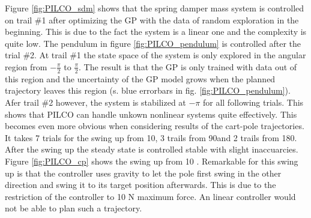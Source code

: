 \documentclass[letterpaper, 10 pt, conference]{ieeeconf}  %
\begin{document}
Figure \ref{fig:PILCO_sdm} shows that the spring damper mass system is controlled on trail \#1 after optimizing the GP with the data of random exploration in the beginning. This is due to the fact the system is a linear one and the complexity is quite low. 
The pendulum in figure \ref{fig:PILCO_pendulum} is controlled after the trial \#2. At trail \#1 the state space of the system is only explored in the angular region from $-\frac{\pi}{2}$ to $\frac{\pi}{2}$. The result is that the GP is only trained with data out of this region and the uncertainty of the GP model grows when the planned trajectory leaves this region (s. blue errorbars in fig. \ref{fig:PILCO_pendulum}). Afer trail \#2 however, the system is stabilized at $-\pi$ for all following trials.
This shows that PILCO can handle unkown nonlinear systems quite effectively. This becomes even more obvious when considering results of the cart-pole trajectories. It takes 7 trials for the swing up from 10\textdegree, 3 trails from 90\textdegree and 2 trails from 180\textdegree . After the swing up the steady state is controlled stable with slight inaccuarcies. Figure \ref{fig:PILCO_cp} shows the swing up from 10 \textdegree. Remarkable for this  swing up is that  the controller uses gravity to let the pole first swing in the other direction and swing it to its target position afterwards. This is due to  the restriction of the controller to 10 N maximum force. An linear controller would not be able to plan such a trajectory.  %


%
%
%
%
%
\end{document}
